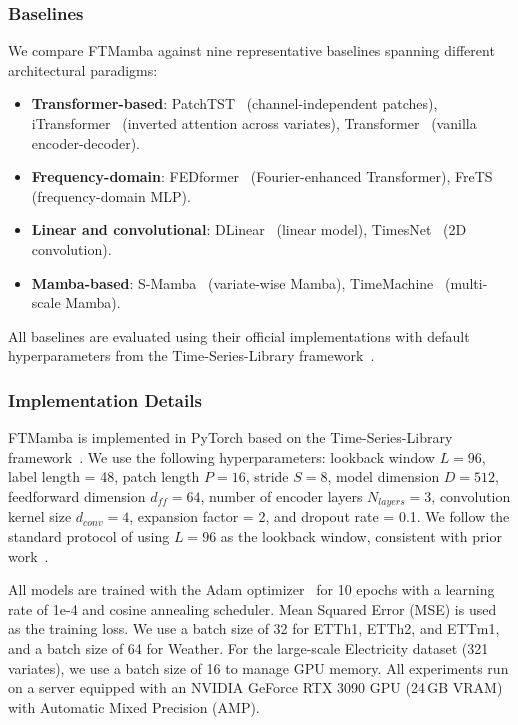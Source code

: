\documentclass[electronics,article,submit,pdftex,moreauthors]{Definitions/mdpi}
\begin{document}
\subsubsection{Baselines}

We compare FTMamba against nine representative baselines spanning different architectural paradigms:

\begin{itemize}
\item \textbf{Transformer-based}: PatchTST~\cite{ref8} (channel-independent patches), iTransformer~\cite{ref9} (inverted attention across variates), Transformer~\cite{ref5} (vanilla encoder-decoder).
\item \textbf{Frequency-domain}: FEDformer~\cite{ref7} (Fourier-enhanced Transformer), FreTS~\cite{ref16} (frequency-domain MLP).
\item \textbf{Linear and convolutional}: DLinear~\cite{ref13} (linear model), TimesNet~\cite{ref14} (2D convolution).
\item \textbf{Mamba-based}: S-Mamba~\cite{ref11} (variate-wise Mamba), TimeMachine~\cite{ref12} (multi-scale Mamba).
\end{itemize}

All baselines are evaluated using their official implementations with default hyperparameters from the Time-Series-Library framework~\cite{ref18}.

\subsubsection{Implementation Details}

FTMamba is implemented in PyTorch based on the Time-Series-Library framework~\cite{ref18}. We use the following hyperparameters: lookback window $L = 96$, label length = 48, patch length $P = 16$, stride $S = 8$, model dimension $D = 512$, feedforward dimension $d_{ff} = 64$, number of encoder layers $N_{layers} = 3$, convolution kernel size $d_{conv} = 4$, expansion factor = 2, and dropout rate = 0.1. We follow the standard protocol of using $L = 96$ as the lookback window, consistent with prior work~\cite{ref8,ref9}.

All models are trained with the Adam optimizer~\cite{ref19} for 10 epochs with a learning rate of 1e-4 and cosine annealing scheduler. Mean Squared Error (MSE) is used as the training loss. We use a batch size of 32 for ETTh1, ETTh2, and ETTm1, and a batch size of 64 for Weather. For the large-scale Electricity dataset (321 variates), we use a batch size of 16 to manage GPU memory. All experiments run on a server equipped with an NVIDIA GeForce RTX 3090 GPU (24\,GB VRAM) with Automatic Mixed Precision (AMP).
\end{document}
